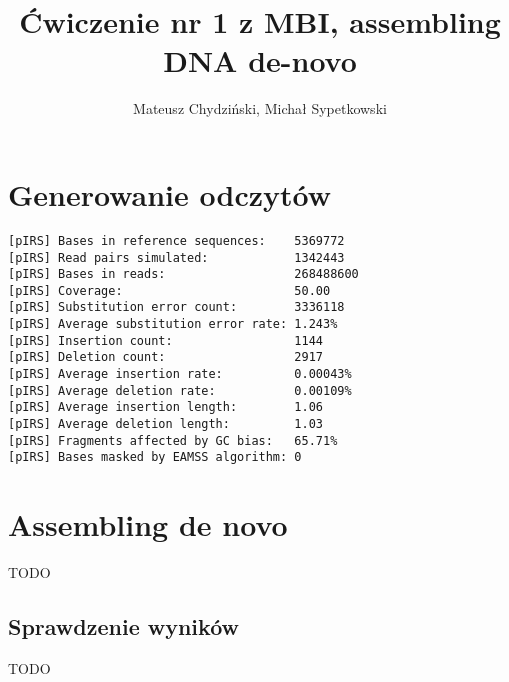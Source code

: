 \documentclass[a4paper]{article}
\begin{document}
\title{Ćwiczenie nr 1 z MBI, assembling DNA de-novo}
\author{Mateusz Chydziński, Michał Sypetkowski}
\maketitle


\section{Generowanie odczytów}
\begin{verbatim}
[pIRS] Bases in reference sequences:    5369772
[pIRS] Read pairs simulated:            1342443
[pIRS] Bases in reads:                  268488600
[pIRS] Coverage:                        50.00
[pIRS] Substitution error count:        3336118
[pIRS] Average substitution error rate: 1.243%
[pIRS] Insertion count:                 1144
[pIRS] Deletion count:                  2917
[pIRS] Average insertion rate:          0.00043%
[pIRS] Average deletion rate:           0.00109%
[pIRS] Average insertion length:        1.06
[pIRS] Average deletion length:         1.03
[pIRS] Fragments affected by GC bias:   65.71%
[pIRS] Bases masked by EAMSS algorithm: 0
\end{verbatim}

\section{Assembling de novo}
TODO
\subsection {Sprawdzenie wyników}
TODO
\end{document}
